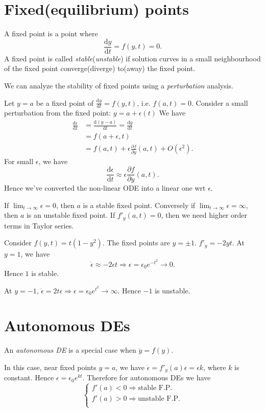 \documentclass[10pt]{article}
\begin{document}
    \section{Fixed(equilibrium) points}
    \begin{definition}
        A fixed point is a point where
        \[
            \frac{\mathrm{d}y}{\mathrm{d}t}=f(y,t)=0 
        .\]
        A fixed point is called \textit{stable}(\textit{unstable}) if solution curves in a small neighbourhood of the fixed point converge(diverge) to(away) the fixed point.
    \end{definition}
    We can analyze the stability of fixed points using a \textit{perturbation} analysis.

    Let $y=a$ be a fixed point of $ \frac{\mathrm{d}y}{\mathrm{d}t}=f(y,t)  $, i.e. $ f(a,t)=0 $. Consider a small perturbation from the fixed point: $ y=a+\epsilon(t) $ We have 
    \[
        \begin{aligned}
            \frac{\mathrm{d}\epsilon}{\mathrm{d}t}&=\frac{\mathrm{d}(y-a)}{\mathrm{d}t}
            = \frac{\mathrm{d}y}{\mathrm{d}t}\\
            &=f(a+\epsilon,t)\\
            &= f(a,t)+\epsilon \frac{\partial f}{\partial y}(a,t)+O(\epsilon^2).
        \end{aligned}
    \]
    For small $ \epsilon $, we have 
    \[
        \frac{\mathrm{d}\epsilon}{\mathrm{d}t}\approx \epsilon \frac{\partial f}{\partial y}(a,t)  
    .\]
    Hence we've converted the non-linear ODE into a linear one wrt $ \epsilon $.

    If $ \lim_{t \to \infty} \epsilon=0 $, then $a$ is a stable fixed point. Conversely if $ \lim_{t \to \infty} \epsilon=\infty  $, then $a$ is an unstable fixed point. If $ f'_y(a,t)=0 $, then we need higher order terms in Taylor series.
    \begin{example}
        Consider $f(y,t)=t(1-y^2)$. The fixed points are $y=\pm 1$. $ f'_y=-2yt $. At $y=1$, we have 
        \[
            \dot{\epsilon}\approx -2\epsilon t \Rightarrow \epsilon=\epsilon_0 e^{-t^2}\to 0
        .\] 
        Hence $1$ is stable.
        
        At $y=-1$, $ \dot{\epsilon}=2t\epsilon \Rightarrow \epsilon=\epsilon_0e^{t^2}\to \infty $. Hence $-1$ is unstable.
    \end{example}
    \section{Autonomous DEs}
    \begin{definition}
        An \textit{autonomous DE} is a special case when $\dot{y}=f(y)$.
    \end{definition}
    In this case, near fixed points $ y=a$, we have $ \dot{\epsilon}=f'_y(a)\epsilon=\epsilon k $, where $k$ is constant. Hence $ \epsilon=\epsilon_0 e^{kt} $. Therefore for autonomous DEs we have 
    \[
      \begin{cases}
      f'(a)<0 \Rightarrow \text{stable F.P.}\\
       f'(a)>0 \Rightarrow \text{unstable F.P.}\\
      \end{cases}   
    \]
\end{document}
